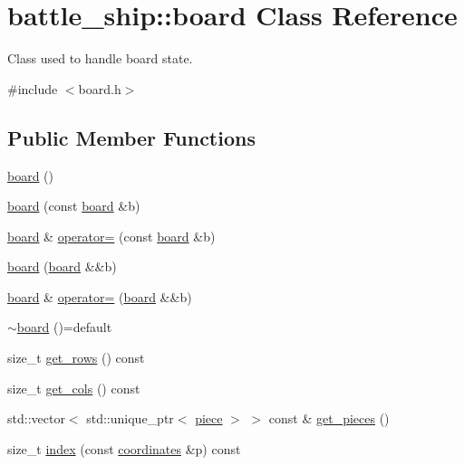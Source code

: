 \hypertarget{classbattle__ship_1_1board}{}\section{battle\+\_\+ship\+:\+:board Class Reference}
\label{classbattle__ship_1_1board}


Class used to handle board state.  




{\ttfamily \#include $<$board.\+h$>$}

\subsection*{Public Member Functions}
\begin{DoxyCompactItemize}
\item 
\hyperlink{classbattle__ship_1_1board_a4d561505fe0c5d355e70bbd2bde1b00e}{board} ()
\item 
\hyperlink{classbattle__ship_1_1board_a72bdef4b84b4c2d8241b4307cae2cb9e}{board} (const \hyperlink{classbattle__ship_1_1board}{board} \&b)
\item 
\hyperlink{classbattle__ship_1_1board}{board} \& \hyperlink{classbattle__ship_1_1board_a4349c045147f686d09cdc47690f15e34}{operator=} (const \hyperlink{classbattle__ship_1_1board}{board} \&b)
\item 
\hyperlink{classbattle__ship_1_1board_aae7ac9e7bbd44c1b2d7a745721936ee2}{board} (\hyperlink{classbattle__ship_1_1board}{board} \&\&b)
\item 
\hyperlink{classbattle__ship_1_1board}{board} \& \hyperlink{classbattle__ship_1_1board_ae6dc011dea24157e59e2b3a6f34af586}{operator=} (\hyperlink{classbattle__ship_1_1board}{board} \&\&b)
\item 
\hyperlink{classbattle__ship_1_1board_a06d4ef9b5cb2dbb7aa4516464ff1ec52}{$\sim$board} ()=default
\item 
size\+\_\+t \hyperlink{classbattle__ship_1_1board_af6bd8f003136c2a98151bbfa34f73142}{get\+\_\+rows} () const
\item 
size\+\_\+t \hyperlink{classbattle__ship_1_1board_a387519f8c260d0c9fa25d1a3fc5bf57f}{get\+\_\+cols} () const
\item 
std\+::vector$<$ std\+::unique\+\_\+ptr$<$ \hyperlink{classbattle__ship_1_1piece}{piece} $>$ $>$ const  \& \hyperlink{classbattle__ship_1_1board_ae621b104b6547d5648eca21c90d43609}{get\+\_\+pieces} ()
\item 
size\+\_\+t \hyperlink{classbattle__ship_1_1board_a9518167fb31ba4fb53091cc9d86e7dba}{index} (const \hyperlink{structbattle__ship_1_1coordinates}{coordinates} \&p) const

\end{DoxyCompactItemize}
